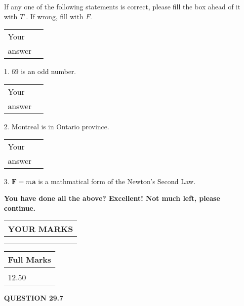 \documentclass[12pt]{article}
\begin{document}
  
If any one of the following statements is correct, please fill the box ahead of it with $T$ .
If wrong, fill with $F$.
 
\noindent\begin{tabular}{|l|l|}\hline Your&\hspace{.2in} \\ answer&\hspace{.2in} \\ \hline \end{tabular}
1. $ %
69$ is an  %
odd number.
 
\noindent\begin{tabular}{|l|l|}\hline Your&\hspace{.2in} \\ answer&\hspace{.2in} \\ \hline \end{tabular}
2.  %
Montreal is in  %
Ontario province.
 
\noindent\begin{tabular}{|l|l|}\hline Your&\hspace{.2in} \\ answer&\hspace{.2in} \\ \hline \end{tabular}
3.  %
$\mathbf{F}=m\mathbf{a}$ is a mathmatical form of
the Newton's Second Law.
 

 
\vspace{0.3in}
   
   
\vspace{0.3in}
{\textbf{\LARGE{You have done all the above? Excellent! Not much left, please continue.}}}
\vspace{0.3in}
   
   
  
\vspace{0.2in}
  
\noindent\begin{tabular}{|l|}
\hline
 YOUR MARKS  \\
\hline
 \\ 
 \\ 
\hline
\end{tabular}
\hspace{0.05in} \begin{tabular}{|l|}
\hline
 Full Marks  \\
\hline
 \\ 
12.50 \\
\hline
\end{tabular}
{\textbf{\Large{QUESTION
29.7 
}}}
  
\end{document}
